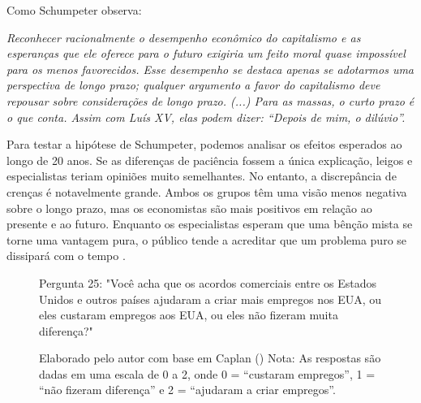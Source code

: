 Como Schumpeter observa: 

\begin{citacao}
    \textit{
        Reconhecer racionalmente o desempenho econômico do capitalismo e as esperanças que ele oferece para o futuro exigiria um feito moral quase impossível para os menos favorecidos. Esse desempenho se destaca apenas se adotarmos uma perspectiva de longo prazo; qualquer argumento a favor do capitalismo deve repousar sobre considerações de longo prazo. (...) Para as massas, o curto prazo é o que conta. Assim com Luís XV, elas podem dizer: “Depois de mim, o dilúvio”.  
    } \newline
    \cite{schumpeter1976capitalism}
\end{citacao}

Para testar a hipótese de Schumpeter, podemos analisar os efeitos esperados ao longo de 20 anos. Se as diferenças de paciência fossem a única explicação, leigos e especialistas teriam opiniões muito semelhantes. No entanto, a discrepância de crenças é notavelmente grande. Ambos os grupos têm uma visão menos negativa sobre o longo prazo, mas os economistas são mais positivos em relação ao presente e ao futuro. Enquanto os especialistas esperam que uma bênção mista se torne uma vantagem pura, o público tende a acreditar que um problema puro se dissipará com o tempo \cite{The_Myth_of_the_Rational_Voter}.


\begin{figure}[H]
    \centering
    \caption*{Pergunta 25: "Você acha que os acordos comerciais entre os Estados Unidos e outros países ajudaram a criar mais empregos nos EUA, ou eles custaram empregos aos EUA, ou eles não fizeram muita diferença?"}
    \caption{Elaborado pelo autor com base em Caplan (\citeyear{The_Myth_of_the_Rational_Voter}) \newline
    Nota: As respostas são dadas em uma escala de 0 a 2, onde 0 = “custaram empregos”, 1 = “não fizeram diferença” e 2 = “ajudaram a criar empregos”.}
    \label{fig:pergunta_25}
\end{figure}

